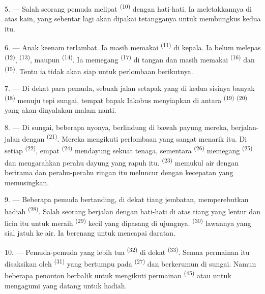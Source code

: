 5. --- Salah seorang pemuda melipat 
\textsuperscript{(10)} dengan hati-hati. Ia meletakkannya di atas kain,
yang sebentar lagi akan dipakai tetangganya untuk membungkus kedua
 itu.

6. --- Anak keenam terlambat. Ia masih memakai 
\textsuperscript{(11)} di kepala. Ia belum melepas 
\textsuperscript{(12)},  \textsuperscript{(13)},
maupun  \textsuperscript{(14)}. Ia memegang
 \textsuperscript{(17)} di tangan dan masih memakai
 \textsuperscript{(16)} dan
 \textsuperscript{(15)}. Tentu ia tidak akan siap
untuk perlombaan berikutnya.

7. --- Di dekat para pemuda, sebuah jalan setapak yang di kedua
sisinya banyak  \textsuperscript{(18)} menuju
tepi sungai, tempat bapak Iakobus menyiapkan di antara
 \textsuperscript{(19)} 
\textsuperscript{(20)} yang akan dinyalakan malam nanti.

\VUsaut{4.4mm}
\VUsaut{3.4mm}

8. --- Di sungai, beberapa nyonya, berlindung di bawah payung mereka,
berjalan-jalan dengan  \textsuperscript{(21)}. Mereka
mengikuti perlombaan yang sangat menarik itu. Di setiap
 \textsuperscript{(22)}, empat
 \textsuperscript{(24)} mendayung sekuat tenaga,
sementara  \textsuperscript{(26)} memegang
 \textsuperscript{(25)} dan mengarahkan perahu dayung
yang rapuh itu.  \textsuperscript{(23)} memukul
air dengan berirama dan perahu-perahu ringan itu meluncur dengan
kecepatan yang memusingkan.

9. --- Beberapa pemuda bertanding, di dekat tiang jembatan,
memperebutkan hadiah  \textsuperscript{(28)}.
Salah seorang berjalan dengan hati-hati di atas tiang yang lentur dan
licin itu untuk meraih  \textsuperscript{(29)} kecil
yang dipasang di ujungnya.  \textsuperscript{(30)}
lawannya yang sial jatuh ke air. Ia berenang untuk mencapai daratan.

10. --- Pemuda-pemuda yang lebih tua 
\textsuperscript{(32)} di dekat  \textsuperscript{(33)}.
Semua permainan itu disaksikan oleh 
\textsuperscript{(31)} yang bertumpu pada 
 \textsuperscript{(27)} dan berkerumun di
 sungai. Namun beberapa penonton berbalik untuk
mengikuti permainan  \textsuperscript{(45)} atau
untuk mengagumi  yang datang untuk
 hadiah.

